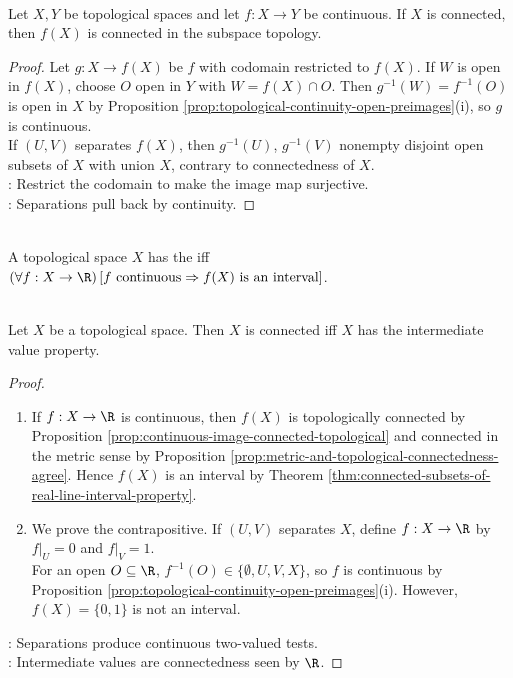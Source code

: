 \begin{proposition} \label{prop:continuous-image-connected-topological} \\
Let $X,Y$ be topological spaces and let $f:X\to Y$ be continuous. If $X$ is connected, then $f(X)$ is connected in the subspace topology.
\begin{proof}
Let $g:X\to f(X)$ be $f$ with codomain restricted to $f(X)$. If $W$ is open in $f(X)$, choose $O$ open in $Y$ with $W=f(X)\cap O$. Then $g^{-1}(W)=f^{-1}(O)$ is open in $X$ by Proposition \ref{prop:topological-continuity-open-preimages}(i), so $g$ is continuous.\\
If $(U,V)$ separates $f(X)$, then $g^{-1}(U)$, $g^{-1}(V)$ nonempty disjoint open subsets of $X$ with union $X$, contrary to connectedness of $X$.\\
: Restrict the codomain to make the image map surjective.\\
: Separations pull back by continuity.
\end{proof}
\end{proposition}

\begin{definition} \label{def:topological-intermediate-value-property} \\
A topological space $X$ has the  iff $(\forall f:X\to\R)\,[f\text{ continuous}\Rightarrow f(X)\text{ is an interval}]$.
\end{definition}

\begin{theorem} \label{thm:topological-connected-iff-ivp} \\
Let $X$ be a topological space. Then $X$ is connected iff $X$ has the intermediate value property.
\begin{proof}
\begin{enumerate}[label=\roman*.]
\setlength{\itemsep}{0pt}
\item[$(\Rightarrow)$] If $f:X\to\R$ is continuous, then $f(X)$ is topologically connected by Proposition \ref{prop:continuous-image-connected-topological} and connected in the metric sense by Proposition \ref{prop:metric-and-topological-connectedness-agree}. Hence $f(X)$ is an interval by Theorem \ref{thm:connected-subsets-of-real-line-interval-property}.
\item[$(\Leftarrow)$] We prove the contrapositive. If $(U,V)$ separates $X$, define $f:X\to\R$ by $f|_U=0$ and $f|_V=1$.\\
For an open $O\subseteq\R$, $f^{-1}(O)\in\{\emptyset,U,V,X\}$, so $f$ is continuous by Proposition \ref{prop:topological-continuity-open-preimages}(i). However, $f(X)=\{0,1\}$ is not an interval.
\end{enumerate}
: Separations produce continuous two-valued tests.\\
: Intermediate values are connectedness seen by $\R$.
\end{proof}
\end{theorem}


